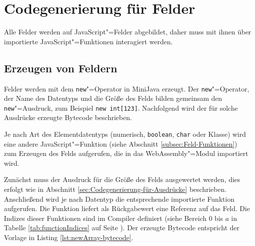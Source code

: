 



\section{Codegenerierung für Felder}
Alle Felder werden auf JavaScript"=Felder abgebildet, daher muss mit ihnen über importierte JavaScript"=Funktionen interagiert werden.

\subsection{Erzeugen von Feldern}
\label{subsec:Erzeugen-von-Feldern}

Felder werden mit dem \lstinline{new}"=Operator in MiniJava erzeugt. Der \lstinline{new}"=Operator, der Name des Datentyps und die Größe des Felds bilden gemeinsam den \lstinline{new}"=Ausdruck, zum Beispiel \lstinline{new int[123]}. Nachfolgend wird der für solche Ausdrücke erzeugte Bytecode beschrieben.

Je nach Art des Elementdatentyps (numerisch, \lstinline{boolean}, \lstinline{char} oder Klasse) wird eine andere JavaScript"=Funktion (siehe Abschnitt \ref{subsec:Feld-Funktionen}) zum Erzeugen des Felds aufgerufen, die in das WebAssembly"=Modul importiert wird.

Zunächst muss der Ausdruck für die Größe des Felds ausgewertet werden, dies erfolgt wie in Abschnitt \ref{sec:Codegenerierung-für-Ausdrücke} beschrieben. Anschließend wird je nach Datentyp die entsprechende importierte Funktion aufgerufen. Die Funktion liefert als Rückgabewert eine Referenz auf das Feld. Die Indizes dieser Funktionen sind im Compiler definiert (siehe Bereich $0$ bis $a$ in Tabelle \ref{tab:functionIndices} auf Seite \pageref{tab:functionIndices}). Der erzeugte Bytecode entspricht der Vorlage in Listing \ref{lst:newArray-bytecode}.



